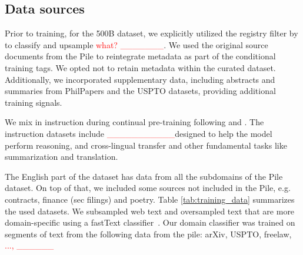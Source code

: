 \iffalse

\subsection{Data sources}

Prior to training, for the 500B dataset, we explicitly utilized the registry filter by \cite{veronica}\fix to classify and upsample \textcolor{red}{what? \_\_\_\_\_\_\_}.
We used the original source documents from the Pile to reintegrate metadata as part of the conditional training tags.
We opted not to retain metadata within the curated dataset. 
Additionally, we incorporated supplementary data, including abstracts and summaries from PhilPapers and the USPTO datasets, providing additional training signals.

We mix in instruction during continual pre-training following \citet{taylor2022galactica} and \citet{Li2021Colossal}.
The instruction datasets include \textcolor{red}{\_\_\_\_\_\_\_\_\_\_\_}\fix designed to help the model perform reasoning, and cross-lingual transfer and other fundamental tasks like summarization and translation.


The English part of the dataset has data from all the subdomains of the Pile dataset.
On top of that, we included some sources not included in the Pile, e.g. contracts, finance
(sec filings) and poetry. 
Table \ref{tab:training_data} summarizes the used datasets.
We subsampled web text and oversampled text that are more domain-specific using a fastText classifier~\citep{joulin2017bag}. 
Our domain classifier was trained on segments of text from the following data from the pile: arXiv, USPTO, freelaw, \textcolor{red}{..., \_\_\_\_\_\_}\fix


